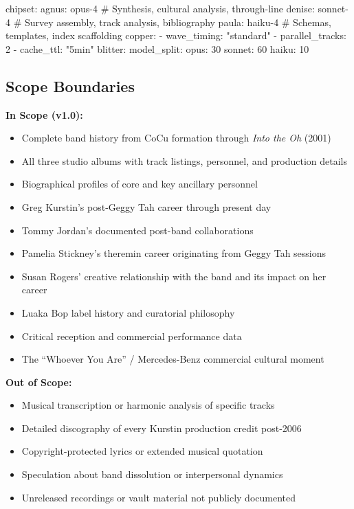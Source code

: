 \documentclass[11pt,letterpaper]{article}
\begin{document}
\begin{asciibox}
chipset:
  agnus: opus-4     # Synthesis, cultural analysis, through-line
  denise: sonnet-4   # Survey assembly, track analysis, bibliography
  paula: haiku-4     # Schemas, templates, index scaffolding
  copper:
    - wave_timing: "standard"
    - parallel_tracks: 2
    - cache_ttl: "5min"
  blitter:
    model_split:
      opus: 30%
      sonnet: 60%
      haiku: 10%
\end{asciibox}

\subsection{Scope Boundaries}

\textbf{In Scope (v1.0):}
\begin{itemize}[leftmargin=2em]
\item Complete band history from CoCu formation through \textit{Into the Oh} (2001)
\item All three studio albums with track listings, personnel, and production details
\item Biographical profiles of core and key ancillary personnel
\item Greg Kurstin's post-Geggy Tah career through present day
\item Tommy Jordan's documented post-band collaborations
\item Pamelia Stickney's theremin career originating from Geggy Tah sessions
\item Susan Rogers' creative relationship with the band and its impact on her career
\item Luaka Bop label history and curatorial philosophy
\item Critical reception and commercial performance data
\item The ``Whoever You Are'' / Mercedes-Benz commercial cultural moment
\end{itemize}

\textbf{Out of Scope:}
\begin{itemize}[leftmargin=2em]
\item Musical transcription or harmonic analysis of specific tracks
\item Detailed discography of every Kurstin production credit post-2006
\item Copyright-protected lyrics or extended musical quotation
\item Speculation about band dissolution or interpersonal dynamics
\item Unreleased recordings or vault material not publicly documented
\end{itemize}
\end{document}
